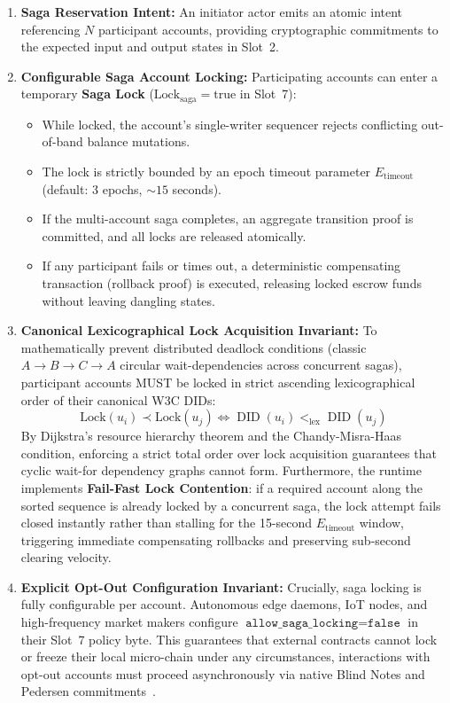 \documentclass[a4paper,11pt,twoside,parskip=half-,headings=small]{scrartcl}
\newcommand{\code}[1]{\texttt{#1}}
\begin{document}
\begin{enumerate}
  \item \textbf{Saga Reservation Intent:} An initiator actor emits an atomic intent referencing $N$ participant accounts, providing cryptographic commitments to the expected input and output states in Slot~2.
  \item \textbf{Configurable Saga Account Locking:} Participating accounts can enter a temporary \textbf{Saga Lock} ($\text{Lock}_{\text{saga}} = \text{true}$ in Slot~7):
  \begin{itemize}
    \item While locked, the account's single-writer sequencer rejects conflicting out-of-band balance mutations.
    \item The lock is strictly bounded by an epoch timeout parameter $E_{\text{timeout}}$ (default: 3 epochs, $\sim 15$ seconds).
    \item If the multi-account saga completes, an aggregate transition proof is committed, and all locks are released atomically.
    \item If any participant fails or times out, a deterministic compensating transaction (rollback proof) is executed, releasing locked escrow funds without leaving dangling states.
  \end{itemize}
  \item \textbf{Canonical Lexicographical Lock Acquisition Invariant:} To mathematically prevent distributed deadlock conditions (classic $A \to B \to C \to A$ circular wait-dependencies across concurrent sagas), participant accounts MUST be locked in strict ascending lexicographical order of their canonical W3C DIDs:
  \begin{equation}
    \text{Lock}(u_i) \prec \text{Lock}(u_j) \iff \operatorname{DID}(u_i) <_{\text{lex}} \operatorname{DID}(u_j)
  \end{equation}
  By Dijkstra's resource hierarchy theorem and the Chandy-Misra-Haas condition, enforcing a strict total order over lock acquisition guarantees that cyclic wait-for dependency graphs cannot form. Furthermore, the runtime implements \textbf{Fail-Fast Lock Contention}: if a required account along the sorted sequence is already locked by a concurrent saga, the lock attempt fails closed instantly rather than stalling for the 15-second $E_{\text{timeout}}$ window, triggering immediate compensating rollbacks and preserving sub-second clearing velocity.
  \item \textbf{Explicit Opt-Out Configuration Invariant:} Crucially, saga locking is fully configurable per account. Autonomous edge daemons, IoT nodes, and high-frequency market makers configure $\code{allow\_saga\_locking} = \code{false}$ in their Slot~7 policy byte. This guarantees that external contracts cannot lock or freeze their local micro-chain under any circumstances, interactions with opt-out accounts must proceed asynchronously via native Blind Notes and Pedersen commitments~\cite{pedersen1991commitment}.
\end{enumerate}
\end{document}
